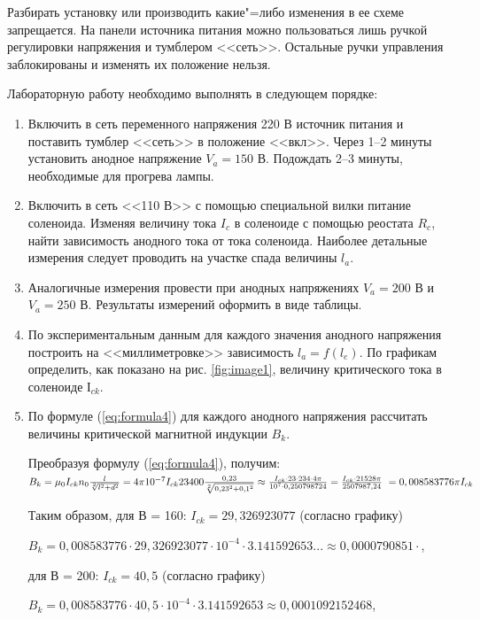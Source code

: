 Разбирать установку или производить какие"=либо изменения в ее схеме запрещается. На панели источника питания можно пользоваться лишь ручкой регулировки напряжения и тумблером <<сеть>>. Остальные ручки управления заблокированы и изменять их положение нельзя.

Лабораторную работу необходимо выполнять в следующем порядке:
\begin{enumerate}
    \item{ Включить в сеть переменного напряжения 220 В источник питания и поставить тумблер <<сеть>> в положение <<вкл>>. Через 1--2 минуты установить анодное напряжение $V_a = 150$ В. Подождать 2--3 минуты, необходимые для прогрева лампы. }
    \item{ Включить в сеть <<110 В>> с помощью специальной вилки питание соленоида. Изменяя величину тока $I_c$ в соленоиде с помощью реостата $R_c$, найти зависимость анодного тока от тока соленоида. Наиболее детальные измерения следует проводить на участке спада величины $l_a$. }
    \item{ Аналогичные измерения провести при анодных напряжениях $V_a = 200$ В и $V_a = 250$ В. Результаты измерений оформить в виде таблицы. }
    \item{ По экспериментальным данным для каждого значения анодного напряжения построить на <<миллиметровке>> зависимость $l_a = f(l_e)$. По графикам определить, как показано на рис. \ref{fig:image1}, величину критического тока в соленоиде $І_{ck}$. }
    \item{ По формуле (\ref{eq:formula4}) для каждого анодного напряжения рассчитать величины критической магнитной индукции $B_k$. }

    Преобразуя формулу (\ref{eq:formula4}), получим:
    $B_k = \mu _0 I_{ck} n_0 \frac{l}{\sqrt[2]{l^2 + d^2}} = \\ 4\pi 10^{-7}I_{ck}23400\frac{0,23}{\sqrt[2]{0,23^2 + 0,1^2}} \approx \frac{I_{ck} \cdot 23 \cdot 234 \cdot 4\pi}{10^{7} \cdot 0,250798724} = \frac{I_{ck} \cdot 21528\pi}{2507987,24} ~= 0,008583776\pi I_{ck}$

    Таким образом, для В = 160: $I_{ck} = 29,326923077$ (согласно графику)
    
    $B_k = 0,008583776 \cdot 29,326923077 \cdot 10^{-4} \cdot 3.141592653... \approx 0,0000790851\cdot$,

    для В = 200: $I_{ck} = 40,5$ (согласно графику)
    
    $B_k = 0,008583776 \cdot 40,5 \cdot 10^{-4} \cdot 3.141592653 \approx 0,0001092152468$,


\end{enumerate}
